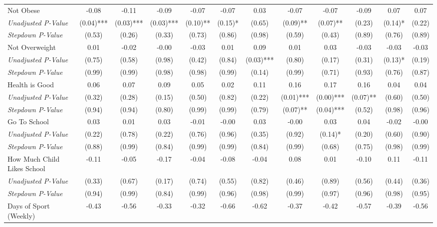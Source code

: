 \begin{tabular}{l c c c c c c c c c c c}
Not Obese & -0.08 & -0.11 & -0.09 & -0.07 & -0.07 & 0.03 & -0.07 & -0.07 & -0.09 & 0.07 & 0.07 \\
\quad \textit{Unadjusted P-Value} & (0.04)*** & (0.03)*** & (0.03)*** & (0.10)** & (0.15)* & (0.65) & (0.09)** & (0.07)** & (0.23) & (0.14)* & (0.22) \\
\quad \textit{Stepdown P-Value} & (0.53) & (0.26) & (0.33) & (0.73) & (0.86) & (0.98) & (0.59) & (0.43) & (0.89) & (0.76) & (0.89) \\
Not Overweight & 0.01 & -0.02 & -0.00 & -0.03 & 0.01 & 0.09 & 0.01 & 0.03 & -0.03 & -0.03 & -0.03 \\
\quad \textit{Unadjusted P-Value} & (0.75) & (0.58) & (0.98) & (0.42) & (0.84) & (0.03)*** & (0.80) & (0.17) & (0.31) & (0.13)* & (0.19) \\
\quad \textit{Stepdown P-Value} & (0.99) & (0.99) & (0.98) & (0.98) & (0.99) & (0.14) & (0.99) & (0.71) & (0.93) & (0.76) & (0.87) \\
Health is Good & 0.06 & 0.07 & 0.09 & 0.05 & 0.02 & 0.11 & 0.16 & 0.17 & 0.16 & 0.04 & 0.04 \\
\quad \textit{Unadjusted P-Value} & (0.32) & (0.28) & (0.15) & (0.50) & (0.82) & (0.22) & (0.01)*** & (0.00)*** & (0.07)** & (0.60) & (0.50) \\
\quad \textit{Stepdown P-Value} & (0.94) & (0.94) & (0.80) & (0.99) & (0.99) & (0.79) & (0.07)** & (0.04)*** & (0.52) & (0.98) & (0.96) \\
Go To School & 0.03 & 0.01 & 0.03 & -0.01 & -0.00 & 0.03 & -0.00 & 0.03 & 0.04 & -0.02 & -0.00 \\
\quad \textit{Unadjusted P-Value} & (0.22) & (0.78) & (0.22) & (0.76) & (0.96) & (0.35) & (0.92) & (0.14)* & (0.20) & (0.60) & (0.90) \\
\quad \textit{Stepdown P-Value} & (0.88) & (0.99) & (0.84) & (0.99) & (0.99) & (0.84) & (0.99) & (0.68) & (0.75) & (0.98) & (0.99) \\
How Much Child Likes School & -0.11 & -0.05 & -0.17 & -0.04 & -0.08 & -0.04 & 0.08 & 0.01 & -0.10 & 0.11 & -0.11 \\
\quad \textit{Unadjusted P-Value} & (0.33) & (0.67) & (0.17) & (0.74) & (0.55) & (0.82) & (0.46) & (0.89) & (0.56) & (0.44) & (0.36) \\
\quad \textit{Stepdown P-Value} & (0.94) & (0.99) & (0.84) & (0.99) & (0.96) & (0.98) & (0.99) & (0.97) & (0.96) & (0.98) & (0.95) \\
Days of Sport (Weekly) & -0.43 & -0.56 & -0.33 & -0.32 & -0.66 & -0.62 & -0.37 & -0.42 & -0.57 & -0.39 & -0.56 \\

\end{tabular}
